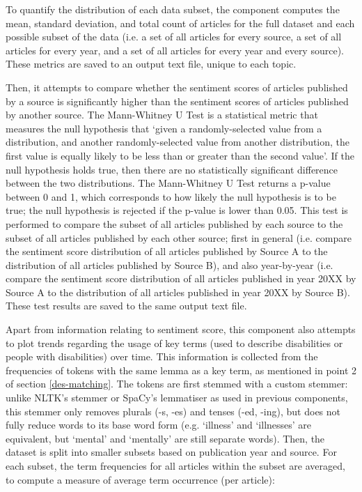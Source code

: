 \documentclass{report}
\begin{document}
To quantify the distribution of each data subset, the component computes the mean, standard deviation, and total count of articles for the full dataset and each possible subset of the data (i.e. a set of all articles for every source, a set of all articles for every year, and a set of all articles for every year and every source). 
These metrics are saved to an output text file, unique to each topic.

Then, it attempts to compare whether the sentiment scores of articles published by a source is significantly higher than the sentiment scores of articles published by another source. 
The Mann-Whitney U Test \cite{mann1947test} is a statistical metric that measures the null hypothesis that `given a randomly-selected value from a distribution, and another randomly-selected value from another distribution, the first value is equally likely to be less than or greater than the second value'.
If the null hypothesis holds true, then there are no statistically significant difference between the two distributions.
The Mann-Whitney U Test returns a p-value between 0 and 1, which corresponds to how likely the null hypothesis is to be true; the null hypothesis is rejected if the p-value is lower than 0.05.
This test is performed to compare the subset of all articles published by each source to the subset of all articles published by each other source; first in general (i.e. compare the sentiment score distribution of all articles published by Source A to the distribution of all articles published by Source B), and also year-by-year (i.e. compare the sentiment score distribution of all articles published in year 20XX by Source A to the distribution of all articles published in year 20XX by Source B). These test results are saved to the same output text file.

Apart from information relating to sentiment score, this component also attempts to plot trends regarding the usage of key terms (used to describe disabilities or people with disabilities) over time.
This information is collected from the frequencies of tokens with the same lemma as a key term, as mentioned in point 2 of section \ref{des-matching}.
The tokens are first stemmed with a custom stemmer: unlike NLTK's stemmer or SpaCy's lemmatiser as used in previous components, this stemmer only removes plurals (-s, -es) and tenses (-ed, -ing), but does not fully reduce words to its base word form (e.g. `illness' and `illnesses' are equivalent, but `mental' and `mentally' are still separate words).
Then, the dataset is split into smaller subsets based on publication year and source.
For each subset, the term frequencies for all articles within the subset are averaged, to compute a measure of average term occurrence (per article):
\end{document}
